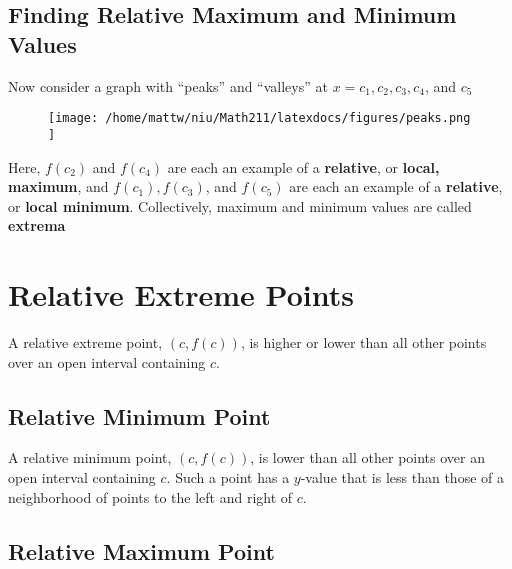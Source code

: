 \documentclass{report}
\begin{document}
  \subsection*{Finding Relative Maximum and Minimum Values}
  Now consider a graph with ``peaks'' and ``valleys'' at $x = c_1, c_2, c_3, c_4$, and $c_5$
  \begin{figure}[ht]
  \centering
  \texttt{[image:  /home/mattw/niu/Math211/latexdocs/figures/peaks.png ]}
  \end{figure}
  \bigbreak \noindent
  Here, $f(c_2)$ and $f(c_4)$ are each an example of a \textbf{relative}, or \textbf{local, maximum}, and $f(c_1), f(c_3)$, and $f(c_5)$ are each an example of a \textbf{relative}, or \textbf{local minimum}.
  \bigbreak \noindent
  Collectively, maximum and minimum values are called \textbf{extrema}
  \pagebreak
\section*{Relative Extreme Points}

A relative extreme point, \( (c, f(c)) \), is higher or lower than all other points over an open interval containing \( c \).

\subsection*{Relative Minimum Point}

A relative minimum point, \( (c, f(c)) \), is lower than all other points over an open interval containing \( c \). Such a point has a \( y \)-value that is less than those of a neighborhood of points to the left and right of \( c \).

\subsection*{Relative Maximum Point}
\end{document}
